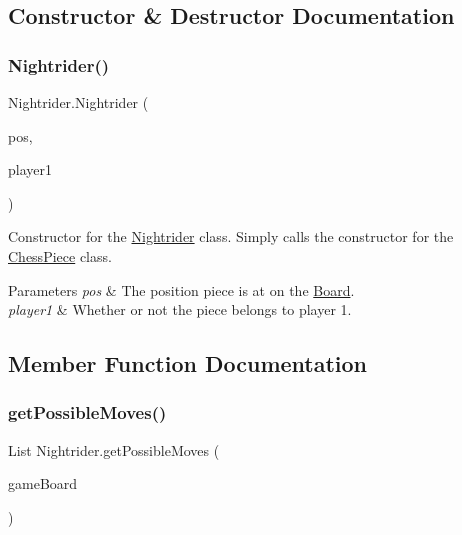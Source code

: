 \subsection{Constructor \& Destructor Documentation}
\mbox{\label{class_nightrider_a19b9e982221207c0108a3e2bbdd302a4}} 
\subsubsection{\texorpdfstring{Nightrider()}{Nightrider()}}
{\footnotesize\ttfamily Nightrider.\+Nightrider (\begin{DoxyParamCaption}\item[{@Not\+Null int \mbox{[}$\,$\mbox{]}}]{pos,  }\item[{boolean}]{player1 }\end{DoxyParamCaption})}

Constructor for the \mbox{\hyperlink{class_nightrider}{Nightrider}} class. Simply calls the constructor for the \mbox{\hyperlink{class_chess_piece}{Chess\+Piece}} class. 
\begin{DoxyParams}{Parameters}
{\em pos} & The position piece is at on the \mbox{\hyperlink{class_board}{Board}}. \\
\hline
{\em player1} & Whether or not the piece belongs to player 1. \\
\hline
\end{DoxyParams}


\subsection{Member Function Documentation}
\mbox{\label{class_nightrider_aa8b346c370506fa6e1c6ab80ed0d16d0}} 
\subsubsection{\texorpdfstring{get\+Possible\+Moves()}{getPossibleMoves()}}
{\footnotesize\ttfamily List Nightrider.\+get\+Possible\+Moves (\begin{DoxyParamCaption}\item[{@Not\+Null \mbox{\hyperlink{class_board}{Board}}}]{game\+Board }\end{DoxyParamCaption})}

